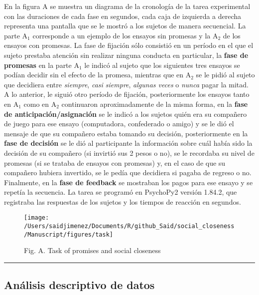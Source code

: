\documentclass[12pt,]{article}
\begin{document}
En la figura A se muestra un diagrama de la cronología de la tarea
experimental con las duraciones de cada fase en segundos, cada caja de
izquierda a derecha representa una pantalla que se le mostró a los
sujetos de manera secuencial. La parte A\(_{1}\) corresponde a un
ejemplo de los ensayos sin promesas y la A\(_{2}\) de los ensayos con
promesas. La fase de fijación sólo consistió en un período en el que el
sujeto prestaba atención sin realizar ninguna conducta en particular, la
\textbf{fase de promesas} en la parte A\(_{1}\) le indicó al sujeto que
los siguientes tres ensayos se podían decidir sin el efecto de la
promesa, mientras que en A\(_{2}\) se le pidió al sujeto que decidiera
entre \emph{siempre}, \emph{casi siempre}, \emph{algunas veces} o
\emph{nunca} pagar la mitad. A lo anterior, le siguió otro período de
fijación, posteriormente los ensayos tanto en A\(_{1}\) como en
A\(_{2}\) continuaron aproximadamente de la misma forma, en la
\textbf{fase de anticipación/asignación} se le indicó a los sujetos
quién era su compañero de juego para ese ensayo (computadora,
confederado o amigo) y se le dió el mensaje de que su compañero estaba
tomando su decisión, posteriormente en la \textbf{fase de decisión} se
le dió al participante la información sobre cuál había sido la decisión
de su compañero (si invirtió sus 2 pesos o no), se le recordaba su nivel
de promesas (si se trataba de ensayos con promesas) y, en el caso de que
su compañero hubiera invertido, se le pedía que decidiera si pagaba de
regreso o no. Finalmente, en la \textbf{fase de feedback} se mostraban
los pagos para ese ensayo y se repetía la secuencia. La tarea se
programó en PsychoPy2 versión 1.84.2, que registraba las respuestas de
los sujetos y los tiempos de reacción en segundos.

\begin{figure}

{\centering \texttt{[image: /Users/saidjimenez/Documents/R/github\_Said/social\_closeness/Manuscript/figures/task]} 

}

\caption{Fig. A. Task of promises and social closeness}\label{fig:figA}
\end{figure}

\begin{center}\rule{0.5\linewidth}{\linethickness}\end{center}

\subsection{Análisis descriptivo de
datos}\label{analisis-descriptivo-de-datos}
\end{document}
